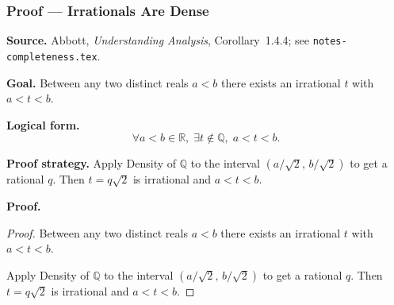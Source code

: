 
\clearpage
{}
\hypertarget{proof-RA-ABB-C-irrationals-dense}{}

\subsubsection[Irrationals Are Dense]{Proof --- Irrationals Are Dense}

\bigskip

\noindent
\textbf{Source.}
Abbott, \emph{Understanding Analysis}, Corollary~1.4.4; see \texttt{notes-completeness.tex}.

\vspace{0.75em}

\noindent
\textbf{Goal.}
Between any two distinct reals $a < b$ there exists an irrational $t$ with $a < t < b$.

\vspace{0.75em}

\noindent
\textbf{Logical form.}
\[
  \forall a < b \in \mathbb{R},\; \exists t \notin \mathbb{Q},\; a < t < b.
\]

\vspace{0.75em}

\noindent
\textbf{Proof strategy.}
Apply Density of $\mathbb{Q}$ to the interval $(a/\sqrt{2},\, b/\sqrt{2})$ to get a rational $q$. Then $t = q\sqrt{2}$ is irrational and $a < t < b$.

\vspace{0.75em}

\noindent
\textbf{Proof.}
\begin{proof}
\Claim Between any two distinct reals $a < b$ there exists an irrational $t$ with $a < t < b$.

\Given 

\Goal 

\Strategy Apply Density of $\mathbb{Q}$ to the interval $(a/\sqrt{2},\, b/\sqrt{2})$ to get a rational $q$. Then $t = q\sqrt{2}$ is irrational and $a < t < b$.

\medskip


\end{proof}

